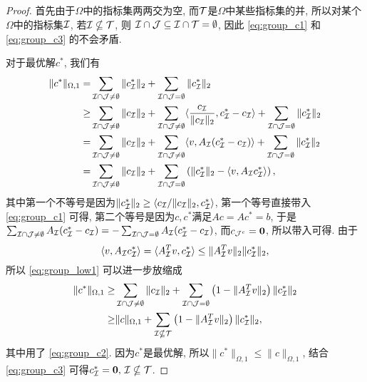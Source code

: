 \begin{proof}
  首先由于$\Omega$中的指标集两两交为空, 而$\mathcal{T}$是$\Omega$中某些指标集的并, 
  所以对某个$\Omega$中的指标集$\mathcal{I}$, 若$\mathcal{I} \nsubseteq \mathcal{T}$, 则
  $\mathcal{I} \cap \mathcal{J}\subseteq \mathcal{I} \cap \mathcal{T} =\emptyset $, 因此 \eqref{eq:group_c1} 和 \eqref{eq:group_c3} 
  的不会矛盾.

  对于最优解$c^*$, 我们有
  \begin{align}
    \|c^*\|_{\Omega, 1} =& \sum_{\mathcal{I} \cap \mathcal{J}\neq \emptyset}\|c^*_{\mathcal{I}}\|_2 +
    \sum_{\mathcal{I} \cap \mathcal{J} = \emptyset} \|c^*_{\mathcal{I}}\|_2 \nonumber \\
    \ge& \sum_{\mathcal{I} \cap \mathcal{J}\neq \emptyset}\|c_{\mathcal{I}}\|_2 + 
    \sum_{\mathcal{I} \cap \mathcal{J}\neq \emptyset}\langle \frac{c_{\mathcal{I}}}{\|c_{\mathcal{I}}\|_2} , c^*_{\mathcal{I}}-c_{\mathcal{I}}\rangle +
    \sum_{\mathcal{I} \cap \mathcal{J}=\emptyset}\|c^*_{\mathcal{I}}\|_2 \nonumber \\
    =& \sum_{\mathcal{I} \cap \mathcal{J}\neq \emptyset}\|c_{\mathcal{I}}\|_2 + 
    \sum_{\mathcal{I} \cap \mathcal{J}\neq \emptyset}\langle v, A_{\mathcal{I}}(c^*_{\mathcal{I}}-c_{\mathcal{I}})\rangle +
    \sum_{\mathcal{I} \cap \mathcal{J} =\emptyset}\|c^*_{\mathcal{I}}\|_2 \nonumber \\
    =& \sum_{\mathcal{I} \cap \mathcal{J}\neq \emptyset}\|c_{\mathcal{I}}\|_2 +
    \sum_{\mathcal{I} \cap \mathcal{J} = \emptyset} \left(\|c^*_{\mathcal{I}}\|_2 -
    \langle v, A_{\mathcal{I}} c^*_{\mathcal{I}}\rangle\right),\label{eq:group_low1}
  \end{align}
  其中第一个不等号是因为$\|c^*_{\mathcal{I}}\|_2 \ge \langle c_{\mathcal{I}}/\|c_{\mathcal{I}}\|_2,c^*_{\mathcal{I}}\rangle$,
  第一个等号直接带入 \eqref{eq:group_c1} 可得,
  第二个等号是因为$c,c^*$满足$Ac=Ac^*=b$, 于是$\sum_{\mathcal{I}\cap\mathcal{J} \neq
  \emptyset}A_{\mathcal{I}}(c_{\mathcal{I}}^*-c_{\mathcal{I}})=
  -\sum_{\mathcal{I} \cap\mathcal{J} =\emptyset} A_{\mathcal{I}}(c_{\mathcal{I}}^*-c_{\mathcal{I}})$,
  而$c_{\mathcal{J}^c}=\mathbf{0}$, 所以带入可得. 由于
  $$\langle v, A_{\mathcal{I}} c_{\mathcal{I}}^*\rangle = \langle A_{\mathcal{I}}^T v,
  c_{\mathcal{I}}^*\rangle \le \|A_{\mathcal{I}}^T v\|_2 \|c_{\mathcal{I}}^*\|_2,$$
  所以 \eqref{eq:group_low1} 可以进一步放缩成
  \begin{align}
    \|c^*\|_{\Omega, 1} \ge& \sum_{\mathcal{I} \cap \mathcal{J}\neq \emptyset}\|c_{\mathcal{I}}\|_2 +
    \sum_{\mathcal{I} \cap \mathcal{J} = \emptyset} \left(1-\|A_{\mathcal{I}}^T v\|_2\right)\|c^*_{\mathcal{I}}\|_2 \nonumber \\
    \ge& \|c\|_{\Omega, 1} + \sum_{\mathcal{I} \nsubseteq \mathcal{T}}\left(1-\|A_{\mathcal{I}}^T
    v\|_2\right)\|c^*_{\mathcal{I}}\|_2,
    \label{eq:group_low2}
  \end{align}
  其中用了 \eqref{eq:group_c2}.   因为$c^*$是最优解,
  所以$\|c^*\|_{\Omega,1}\le \|c\|_{\Omega, 1}$,
  结合 \eqref{eq:group_c3} 可得$c^*_{\mathcal{I}} = \mathbf{0},\, \mathcal{I} \nsubseteq \mathcal{T}$.
\end{proof}

